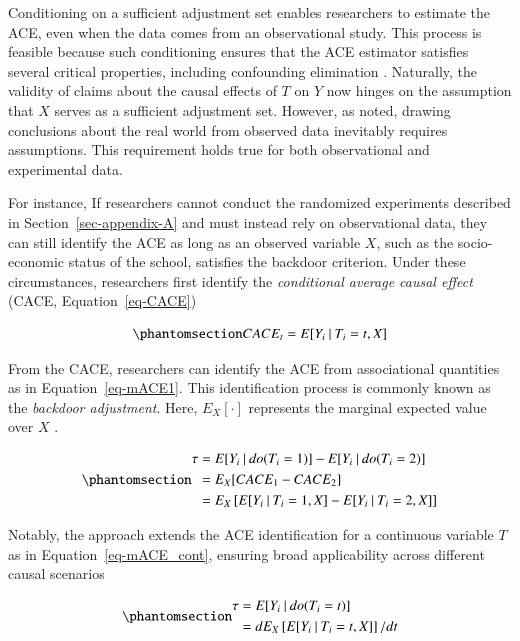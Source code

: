 \documentclass[
  authoryear,
  review,
  1p]{elsarticle}
\begin{document}
Conditioning on a sufficient adjustment set enables researchers to
estimate the ACE, even when the data comes from an observational study.
This process is feasible because such conditioning ensures that the ACE
estimator satisfies several critical properties, including confounding
elimination \citep{Morgan_et_al_2014}. Naturally, the validity of claims
about the causal effects of \(T\) on \(Y\) now hinges on the assumption
that \(X\) serves as a sufficient adjustment set. However, as
\citet[pp.~150]{Kohler_et_al_2019} noted, drawing conclusions about the
real world from observed data inevitably requires assumptions. This
requirement holds true for both observational and experimental data.

For instance, If researchers cannot conduct the randomized experiments
described in Section~\ref{sec-appendix-A} and must instead rely on
observational data, they can still identify the ACE as long as an
observed variable \(X\), such as the socio-economic status of the
school, satisfies the backdoor criterion. Under these circumstances,
researchers first identify the \emph{conditional average causal effect}
(CACE, Equation~\ref{eq-CACE})

\begin{equation}\phantomsection\label{eq-CACE}{
CACE_{t} = E[Y_{i} \:|\:T_{i}=t, X]
}\end{equation}

From the CACE, researchers can identify the ACE from associational
quantities as in Equation~\ref{eq-mACE1}. This identification process is
commonly known as the \emph{backdoor adjustment}. Here, \(E_{X}[\cdot]\)
represents the marginal expected value over \(X\)
\citep{Morgan_et_al_2014}.

\begin{equation}\phantomsection\label{eq-mACE1}{
\begin{aligned}
  \tau & = E[Y_{i} \:|\:do(T_{i}=1)]- E[Y_{i} \:|\:do(T_{i}=2)] \\
  & = E_{X}[CACE_{1} - CACE_{2}] \\
  & = E_{X}\left[ E[Y_{i} \:|\:T_{i}=1, X] - E[Y_{i} \:|\:T_{i}=2, X] \right]
\end{aligned}
}\end{equation}

Notably, the approach extends the ACE identification for a continuous
variable \(T\) as in Equation~\ref{eq-mACE_cont}, ensuring broad
applicability across different causal scenarios
\citep[pp.~45]{Neal_2020}

\begin{equation}\phantomsection\label{eq-mACE_cont}{
\begin{aligned}
  \tau &= E[Y_{i} \:|\:do(T_{i}=t)] \\
  & = d E_{X}\left[ E[Y_{i} \:|\:T_{i}=t, X]\right]/ dt
  \end{aligned}
}\end{equation}
\end{document}
